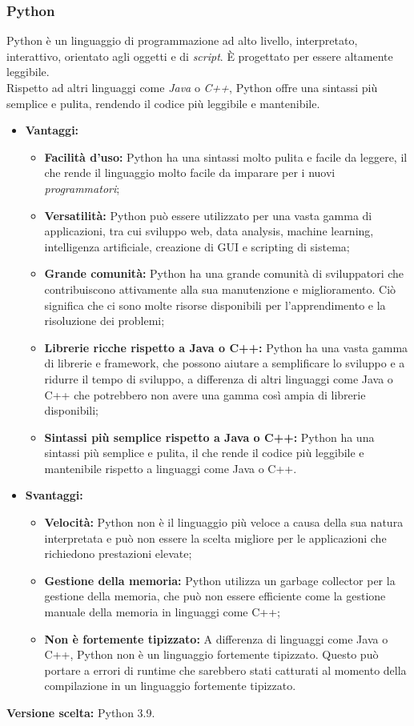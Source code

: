 \documentclass[10pt, a4paper]{article}
\begin{document}
\subsubsection{Python}
Python è un linguaggio di programmazione ad alto livello, interpretato, interattivo, orientato agli oggetti e di \textit{script\pg}. È progettato per essere altamente leggibile.\\ Rispetto ad altri linguaggi come \textit{Java\pg} o \textit{C++\pg}, Python offre una sintassi più semplice e pulita, rendendo il codice più leggibile e mantenibile.

\begin{itemize}
\item \textbf{Vantaggi:}
\begin{itemize}
\item \textbf{Facilità d'uso:} Python ha una sintassi molto pulita e facile da leggere, il che rende il linguaggio molto facile da imparare per i nuovi \textit{programmatori\pg};
\item \textbf{Versatilità:} Python può essere utilizzato per una vasta gamma di applicazioni, tra cui sviluppo web, data analysis, machine learning, intelligenza artificiale, creazione di GUI e scripting di sistema;
\item \textbf{Grande comunità:} Python ha una grande comunità di sviluppatori che contribuiscono attivamente alla sua manutenzione e miglioramento. Ciò significa che ci sono molte risorse disponibili per l'apprendimento e la risoluzione dei problemi;
\item \textbf{Librerie ricche rispetto a Java o C++:} Python ha una vasta gamma di librerie e framework, che possono aiutare a semplificare lo sviluppo e a ridurre il tempo di sviluppo, a differenza di altri linguaggi come Java o C++ che potrebbero non avere una gamma così ampia di librerie disponibili;
\item \textbf{Sintassi più semplice rispetto a Java o C++:} Python ha una sintassi più semplice e pulita, il che rende il codice più leggibile e mantenibile rispetto a linguaggi come Java o C++.
\end{itemize}
\item \textbf{Svantaggi:}
\begin{itemize}
\item \textbf{Velocità:} Python non è il linguaggio più veloce a causa della sua natura interpretata e può non essere la scelta migliore per le applicazioni che richiedono prestazioni elevate;
\item \textbf{Gestione della memoria:} Python utilizza un garbage collector per la gestione della memoria, che può non essere efficiente come la gestione manuale della memoria in linguaggi come C++;
\item \textbf{Non è fortemente tipizzato:} A differenza di linguaggi come Java o C++, Python non è un linguaggio fortemente tipizzato. Questo può portare a errori di runtime che sarebbero stati catturati al momento della compilazione in un linguaggio fortemente tipizzato.
\end{itemize}
\end{itemize}
\textbf{Versione scelta:} Python 3.9.
\end{document}
